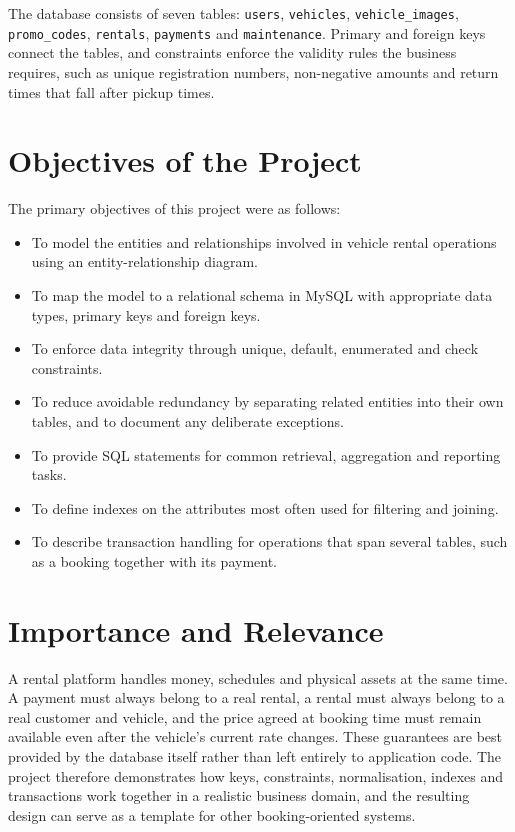 \documentclass[10pt,a4paper]{report}
\newcommand{\col}[1]{\texttt{#1}}
\begin{document}
The database consists of seven tables: \col{users}, \col{vehicles}, \col{vehicle_images}, \col{promo_codes}, \col{rentals}, \col{payments} and \col{maintenance}. Primary and foreign keys connect the tables, and constraints enforce the validity rules the business requires, such as unique registration numbers, non-negative amounts and return times that fall after pickup times.

\section{Objectives of the Project}
The primary objectives of this project were as follows:
\begin{itemize}
  \item To model the entities and relationships involved in vehicle rental operations using an entity-relationship diagram.
  \item To map the model to a relational schema in MySQL with appropriate data types, primary keys and foreign keys.
  \item To enforce data integrity through unique, default, enumerated and check constraints.
  \item To reduce avoidable redundancy by separating related entities into their own tables, and to document any deliberate exceptions.
  \item To provide SQL statements for common retrieval, aggregation and reporting tasks.
  \item To define indexes on the attributes most often used for filtering and joining.
  \item To describe transaction handling for operations that span several tables, such as a booking together with its payment.
\end{itemize}

\section{Importance and Relevance}
A rental platform handles money, schedules and physical assets at the same time. A payment must always belong to a real rental, a rental must always belong to a real customer and vehicle, and the price agreed at booking time must remain available even after the vehicle's current rate changes. These guarantees are best provided by the database itself rather than left entirely to application code. The project therefore demonstrates how keys, constraints, normalisation, indexes and transactions work together in a realistic business domain, and the resulting design can serve as a template for other booking-oriented systems.
\end{document}
